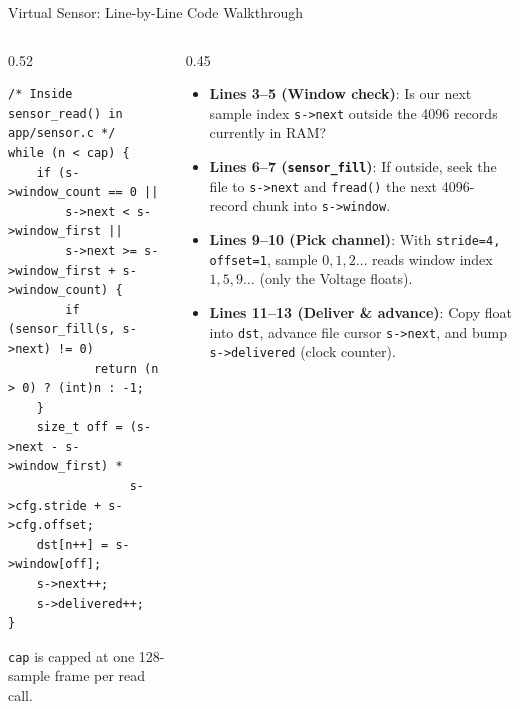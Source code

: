 \begin{frame}[fragile]{Virtual Sensor: Line-by-Line Code Walkthrough}
  \begin{columns}[t, onlytextwidth]
    \begin{column}{0.52\textwidth}
\begin{lstlisting}
/* Inside sensor_read() in app/sensor.c */
while (n < cap) {
    if (s->window_count == 0 ||
        s->next < s->window_first ||
        s->next >= s->window_first + s->window_count) {
        if (sensor_fill(s, s->next) != 0)
            return (n > 0) ? (int)n : -1;
    }
    size_t off = (s->next - s->window_first) *
                 s->cfg.stride + s->cfg.offset;
    dst[n++] = s->window[off];
    s->next++;
    s->delivered++;
}
\end{lstlisting}
      {\scriptsize \texttt{cap} is capped at one 128-sample frame per read call.}
    \end{column}
    \begin{column}{0.45\textwidth}
      \smalltext\compactitem
      \begin{itemize}
        \item \textbf{Lines 3--5 (Window check)}: Is our next sample index \texttt{s->next} outside the 4096 records currently in RAM?
        \item \textbf{Lines 6--7 (\texttt{sensor\_fill})}: If outside, seek the file to \texttt{s->next} and \texttt{fread()} the next 4096-record chunk into \texttt{s->window}.
        \item \textbf{Lines 9--10 (Pick channel)}: With \texttt{stride=4, offset=1}, sample $0,1,2\dots$ reads window index $1, 5, 9\dots$ (only the Voltage floats).
        \item \textbf{Lines 11--13 (Deliver \& advance)}: Copy float into \texttt{dst}, advance file cursor \texttt{s->next}, and bump \texttt{s->delivered} (clock counter).
      \end{itemize}
    \end{column}
  \end{columns}
\end{frame}

